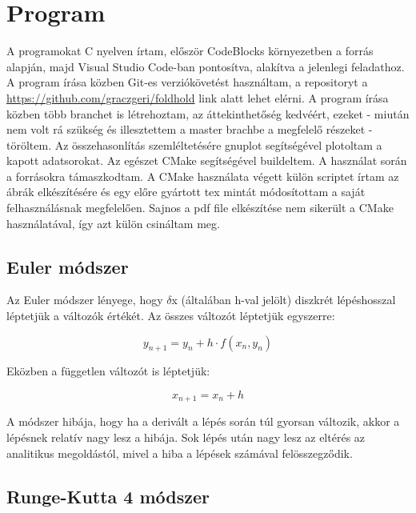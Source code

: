 \documentclass[a4paper, 12pt]{article}
\begin{document}
\section{Program}
\label{sec:prog}

A programokat C nyelven írtam, először CodeBlocks környezetben a \cite{artic:negyedik} forrás alapján, majd Visual Studio Code-ban pontosítva, alakítva a jelenlegi feladathoz. A program írása közben Git-es verziókövetést használtam, a repositoryt a \url{https://github.com/graczgeri/foldhold} link alatt lehet elérni. A program írása közben több branchet is létrehoztam, az áttekinthetőség kedvéért, ezeket - miután nem volt rá szükség és illesztettem a master brachbe a megfelelő részeket - töröltem. Az összehasonlítás szemléltetésére gnuplot segítségével plotoltam a kapott adatsorokat. Az egészet CMake segítségével buildeltem. A használat során a \cite{artic:elso,artic:masodik} forrásokra támaszkodtam. A CMake használata végett külön scriptet írtam az ábrák elkészítésére és egy előre gyártott tex mintát módosítottam a saját felhasználásnak megfelelően. Sajnos a pdf file elkészítése nem sikerült a CMake használatával, így azt külön csináltam meg.

\subsection{Euler módszer}
\label{subsec:euler_1}

Az Euler módszer lényege, hogy $\delta$x (általában h-val jelölt) diszkrét lépéshosszal léptetjük a változók értékét. Az összes változót léptetjük egyszerre:
\begin{center}
\begin{equation}
y_{n+1}=y_n+h\cdot f(x_n,y_n)
\end{equation}
\end{center}
Eközben a független változót is léptetjük:
\begin{center}
\begin{equation}
x_{n+1}=x_n+h
\end{equation}
\end{center}
A módszer hibája, hogy ha a derivált a lépés során túl gyorsan változik, akkor a lépésnek relatív nagy lesz a hibája. Sok lépés után nagy lesz az eltérés az analitikus megoldástól, mivel a hiba a lépések számával felösszegződik.

\subsection{Runge-Kutta 4 módszer}
\label{subsec:rk4_1}
\end{document}
